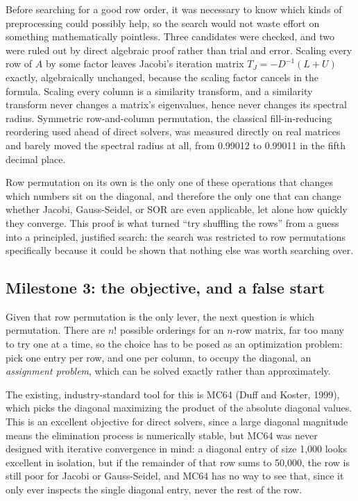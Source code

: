\documentclass[11pt,a4paper]{article}
\begin{document}
Before searching for a good row order, it was necessary to know which kinds of
preprocessing could possibly help, so the search would not waste effort on something
mathematically pointless. Three candidates were checked, and two were ruled out by direct
algebraic proof rather than trial and error. Scaling every row of $A$ by some factor
leaves Jacobi's iteration matrix $T_J = -D^{-1}(L+U)$ exactly, algebraically unchanged,
because the scaling factor cancels in the formula. Scaling every column is a similarity
transform, and a similarity transform never changes a matrix's eigenvalues, hence never
changes its spectral radius. Symmetric row-and-column permutation, the classical
fill-in-reducing reordering used ahead of direct solvers, was measured directly on real
matrices and barely moved the spectral radius at all, from 0.99012 to 0.99011 in the
fifth decimal place.

Row permutation on its own is the only one of these operations that changes which numbers
sit on the diagonal, and therefore the only one that can change whether Jacobi,
Gauss-Seidel, or SOR are even applicable, let alone how quickly they converge. This proof
is what turned ``try shuffling the rows'' from a guess into a principled, justified
search: the search was restricted to row permutations specifically because it could be
shown that nothing else was worth searching over.

\subsection{Milestone 3: the objective, and a false start}
\label{sec:novel-objective}

Given that row permutation is the only lever, the next question is which permutation.
There are $n!$ possible orderings for an $n$-row matrix, far too many to try one at a
time, so the choice has to be posed as an optimization problem: pick one entry per row,
and one per column, to occupy the diagonal, an \emph{assignment problem}, which can be
solved exactly rather than approximately.

The existing, industry-standard tool for this is MC64 (Duff and Koster, 1999), which
picks the diagonal maximizing the product of the absolute diagonal values. This is an
excellent objective for direct solvers, since a large diagonal magnitude means the
elimination process is numerically stable, but MC64 was never designed with iterative
convergence in mind: a diagonal entry of size 1{,}000 looks excellent in isolation, but if
the remainder of that row sums to 50{,}000, the row is still poor for Jacobi or
Gauss-Seidel, and MC64 has no way to see that, since it only ever inspects the single
diagonal entry, never the rest of the row.
\end{document}
